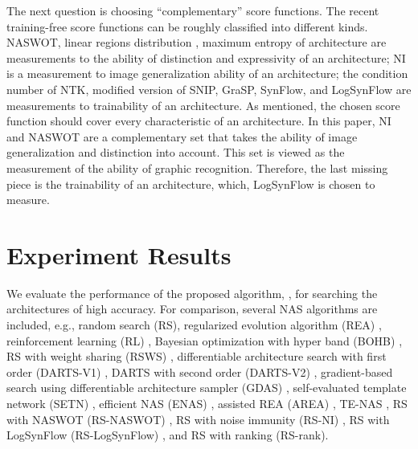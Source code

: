 \documentclass[sigconf]{acmart}
\begin{document}
    The next question is choosing ``complementary'' score functions. The recent training-free 
    score functions can be roughly classified into different kinds. NASWOT, 
    linear regions distribution \cite{https://doi.org/10.48550/arxiv.2102.11535} \cite{lin2021zennas}, 
    maximum entropy of architecture \cite{sun2022maedet} are measurements 
    to the ability of distinction and expressivity of an architecture; 
    NI is a measurement to image generalization ability of an architecture; 
    the condition number of NTK, modified version of SNIP, GraSP, SynFlow, and 
    LogSynFlow are measurements to trainability of an architecture. 
    As mentioned, the chosen score function should cover every characteristic 
    of an architecture. In this paper, NI and NASWOT are a complementary set 
    that takes the ability of image generalization and distinction into account. 
    This set is viewed as the measurement of the ability of graphic 
    recognition. Therefore, the last missing piece is the trainability of an 
    architecture, which, LogSynFlow is chosen to measure. 

    \section{Experiment Results}
    \label{sec:results}

    We evaluate the performance of the proposed algorithm, \palg{}, 
    for searching the architectures of high accuracy. For comparison, several NAS 
    algorithms are included, e.g., random search (RS), regularized evolution algorithm 
    (REA) \cite{real2019regularized}, reinforcement learning (RL) \cite{williams1992simple}, 
    Bayesian optimization with hyper band (BOHB) \cite{falkner2018bohb}, RS with 
    weight sharing (RSWS) \cite{li2019random}, differentiable architecture search 
    with first order (DARTS-V1) \cite{liu2019darts}, DARTS with second order 
    (DARTS-V2) \cite{liu2019darts}, gradient-based search using differentiable 
    architecture sampler (GDAS) \cite{dong2019searching}, self-evaluated template 
    network (SETN) \cite{Dong_2019}, efficient NAS (ENAS) \cite{pham2018efficient}, 
    assisted REA (AREA) \cite{https://doi.org/10.48550/arxiv.2006.04647}, 
    TE-NAS \cite{https://doi.org/10.48550/arxiv.2102.11535}, RS with NASWOT (RS-NASWOT) \cite{https://doi.org/10.48550/arxiv.2006.04647}, 
    RS with noise immunity (RS-NI) \cite{10092788}, RS with LogSynFlow (RS-LogSynFlow) \cite{Cavagnero_2023}, 
    and RS with ranking (RS-rank). 
\end{document}
